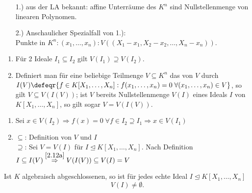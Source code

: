 \begin{nnBsp} 
  \begin{enumerate}
    \item[1.)] aus der LA bekannt: affine Unterräume des $K^n$ sind
               Nullstellenmenge von linearen Polynomen.
    \item[2.)] Anschaulicher Spezialfall von 1.):\\
               Punkte in $K^n: (x_1, \dots, x_n): V((X_1-x_1, X_2 - x_2, \dots,
               X_n - x_n))$.
  \end{enumerate}
\end{nnBsp}

\begin{BemDef}
  \begin{enumerate}
    \item \label{2.12a}Für 2 Ideale $I_1 \subseteq I_2$ gilt $V(I_1) \supseteq V(I_2)$.
    \item Definiert man für eine beliebige Teilmenge $V \subseteq K^n$ das                                          von $V$ durch $I(V) \defeqr \{ f \in K[X_1,         \dots, X_n]: f(x_1, \dots, x_n) = 0 \; \forall (x_1, \dots, x_n) \in V\}$, so gilt $V \subseteq          V(I(V))$; ist $V$ bereits Nullstellenmenge $V(I)$ eines Ideals $I$ von $K[X_1, \dots, X_n]$, so          gilt sogar $V = V(I(V))$.
  \end{enumerate}
\end{BemDef}

\begin{Bew}
  \begin{enumerate}
    \item Sei $x \in V(I_2) \Rightarrow f(x) = 0 \; \forall f \in I_2 \supseteq I_1 \Rightarrow x \in V(I_1)$
    \item \glqq$\subseteq$\grqq: Definition von $V$ und $I$\\
          \glqq$\supseteq$\grqq: Sei $V = V(I)$ für $I \trianglelefteq K[X_1, \dots, X_n]$.
	  Nach Definition $I \subseteq I(V) \overset{\ref{2.12a}}{\Rightarrow} V(I(V)) \subseteq V(I) = V$
  \end{enumerate}
\end{Bew}

\begin{nnSatz}
\label{SatzSchwach}
  Ist $K$ algebraisch abgeschlossenen, so ist für jedes echte Ideal $I \trianglelefteq K[X_1, \dots, X_n]$
   \[
   V(I) \not= \emptyset.
   \]
\end{nnSatz}

